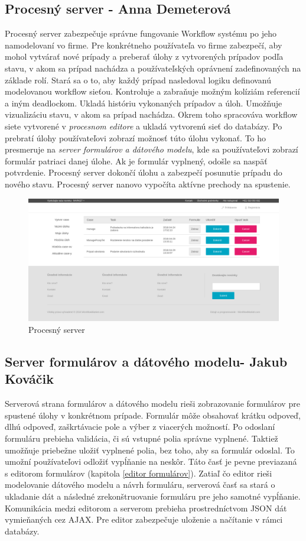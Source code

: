 \subsection{Procesný server - Anna Demeterová}
Procesný server zabezpečuje správne fungovanie Workflow systému po jeho namodelovaní vo firme. Pre konkrétneho používateľa vo firme zabezpečí, aby mohol vytvárať nové prípady a preberať úlohy z vytvorených prípadov podľa stavu, v akom sa prípad nachádza a používateľských oprávnení zadefinovaných na základe rolí. Stará sa o to, aby každý prípad nasledoval logiku definovanú modelovanou workflow sieťou. Kontroluje a zabraňuje možným  kolíziám referencií a iným deadlockom.  
Ukladá históriu vykonaných prípadov a úloh. Umožňuje vizualizáciu stavu, v akom sa prípad nachádza. Okrem toho spracováva workflow siete vytvorené v \emph{procesnom editore} a ukladá vytvorenú sieť do databázy. Po prebratí úlohy používateľovi zobrazí možnosť túto úlohu vykonať. To ho presmeruje na \emph{server formulárov a dátového modelu}, kde sa používateľovi zobrazí formulár patriaci danej úlohe. Ak je formulár vyplnený, odošle sa naspäť potvrdenie. Procesný server dokončí úlohu a zabezpečí posunutie prípadu do nového stavu. Procesný server nanovo vypočíta aktívne prechody na spustenie.

\begin{figure}[H]
	\centering
	\includegraphics[width=0.8\linewidth]{images/anicka}
	\caption{Procesný server}
	\label{fig:Procesný server}
\end{figure}



\subsection{Server formulárov a dátového modelu- Jakub Kováčik}
Serverová strana formulárov a dátového modelu rieši zobrazovanie formulárov pre spustené úlohy v konkrétnom prípade. Formulár môže obsahovať krátku odpoveď, dlhú odpoveď, zaškrtávacie pole a výber z viacerých možností. Po odoslaní formuláru prebieha validácia, či sú vstupné polia správne vyplnené. Taktiež umožňuje priebežne uložiť vyplnené polia, bez toho, aby sa formulár odoslal. To umožní používateľovi odložiť vypĺňanie na neskôr. Táto časť je pevne previazaná s editorom formulárov (kapitola \ref{editor formulárov}). Zatiaľ čo editor rieši modelovanie dátového modelu a návrh formuláru, serverová časť sa stará o ukladanie dát a následné zrekonštruovanie formuláru pre jeho samotné vypĺňanie. Komunikácia medzi editorom a serverom prebieha prostredníctvom JSON dát vymieňaných cez AJAX. Pre editor zabezpečuje uloženie a načítanie v rámci databázy. 


